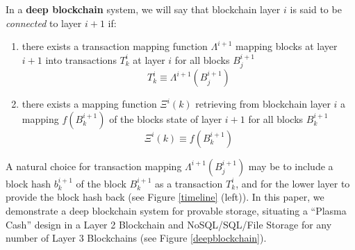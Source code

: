 \documentclass{article}
\newcommand{\block}[2]{B^{#1}_{#2}}
\newcommand{\blockhash}[2]{b^{#1}_{#2}}
\newcommand{\submission}[1]{\Lambda^{#1}}
\newcommand{\transaction}[2]{T_{#2}^#1}
\newcommand{\retrieval}[1]{\Xi^{#1}}
\begin{document}
In a {\bf deep blockchain} system, we will say that blockchain layer $i$ is said to be {\em connected} to layer $i+1$ if:
\begin{enumerate}
    \item there exists a transaction mapping function $\submission{i+1}$ mapping blocks at layer $i+1$ into transactions $\transaction{i}{k}$ at layer $i$ for all blocks $\block{i+1}{j}$
\begin{equation}
\transaction{i}{k} \equiv \submission{i+1}(\block{i+1}{j})
\end{equation}
    \item there exists a mapping function $\retrieval{i}(k)$ retrieving from blockchain layer $i$ a mapping  $f(\block{i+1}{k})$ of the blocks state of layer $i+1$  for all blocks $\block{i+1}{k}$
\begin{equation}
\retrieval{i}(k) \equiv f(\block{i+1}{k})
\end{equation}
\end{enumerate}
A natural choice for transaction mapping $\submission{i+1}(\block{i+1}{j})$ may be to include a block hash $\blockhash{i+1}{k}$ of the block $\block{i+1}{k}$ as a transaction $\transaction{i}{k}$, and for the lower layer to provide the block hash back (see Figure \ref{timeline} (left)).  In this paper, we demonstrate a deep blockchain system for provable storage, situating a ``Plasma Cash'' design \cite{plasmacashsimplespec} in a Layer 2 Blockchain and NoSQL/SQL/File Storage for any number of Layer 3 Blockchains (see Figure \ref{deepblockchain}).
\end{document}
